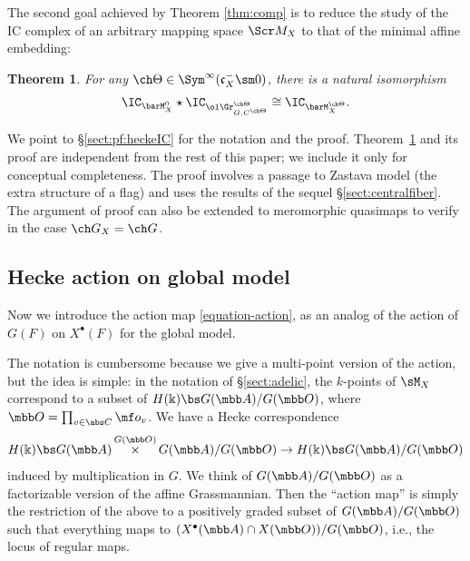 \documentclass[final]{amsart}
\newtheorem{thm}[subsubsection]{Theorem}
\theoremstyle{remark}
\theoremstyle{definition}
\DeclareMathOperator*{\xt}{\times}
\numberwithin{equation}{section}
\begin{document}
The second goal achieved by Theorem \ref{thm:comp} is to reduce the study of the IC complex of an arbitrary mapping space $\Scr M_X$ to that of the minimal affine embedding:

\begin{thm} \label{thm:heckeIC}
For any $\ch\Theta \in \Sym^\infty(\mathfrak c_X^- \sm 0)$, there
is a natural isomorphism 
\[ \IC_{\barM_X^0} \star \IC_{\ol\Gr^{\ch\Theta}_{G,C^{\ch\Theta}}} \cong 
\IC_{\barM^{\ch\Theta}_X}. \] 
\end{thm}

We point to \S\ref{sect:pf:heckeIC} for the notation and the proof.  
Theorem~\ref{thm:heckeIC} and its proof are independent from the rest of this paper; we
include it only for conceptual completeness. 
The proof involves a passage to Zastava model (the extra structure of a flag)
and uses the results of the sequel \S\ref{sect:centralfiber}.
The argument of proof can also be extended to meromorphic quasimaps to verify
\cite[Conjecture 7.3.2]{GN} in the case $\ch G_X = \ch G$. 

\subsection{Hecke action on global model} \label{sect:Heckeglob}

Now we introduce the action map \eqref{equation-action}, as an analog of the 
action of $G(F)$ on $X^\bullet(F)$ for the global model.

The notation is cumbersome because we give a multi-point version of the action, but
the idea is simple: in the notation of \S\ref{sect:adelic}, 
the $k$-points of $\sM_X$ correspond to a subset of $H(\Bbbk) \bs G(\mbb A) / G(\mbb O)$, where $\mbb O = \prod_{v\in \abs C} \mf o_v$. 
We have a Hecke correspondence 
\[ H(\Bbbk) \bs G(\mbb A) \xt^{G(\mbb O)} G(\mbb A) / G(\mbb O) \to H(\Bbbk) \bs G(\mbb A) / G(\mbb O) \]
induced by multiplication in $G$. We think of $G(\mbb A)/G(\mbb O)$ as a
factorizable version of the affine Grassmannian. Then the ``action map'' 
is simply the restriction of the above to a positively graded subset of $G(\mbb A)/G(\mbb O)$ 
such that everything maps to $(X^\bullet(\mbb A) \cap X(\mbb O))/G(\mbb O)$, i.e., 
the locus of regular maps. 
\end{document}

